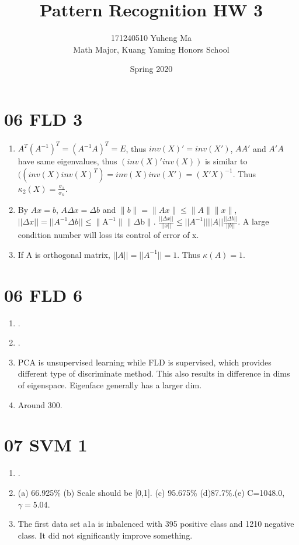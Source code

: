 \documentclass[10pt, oneside]{article}
\title{
Pattern Recognition HW 3
}
\author{171240510 Yuheng Ma\\[0.3cm]{Math Major, Kuang Yaming Honors School}}
\date{Spring 2020}
\begin{document}
\maketitle

\vspace{.25in}
\section{06 FLD 3}
\begin{enumerate}
	\item $A^{T}\left(A^{-1}\right)^{T}=\left(A^{-1} A\right)^{T}=E$, thus $inv(X)'=inv(X')$, $AA'$ and $A'A$ have same eigenvalues, thus $(inv(X)'inv(X))$ is similar to $((inv(X)inv(X)^T)=inv(X)inv(X')=(X'X)^{-1}$. Thus $\kappa_{2}(X)= \frac{\sigma_1}{\sigma_n}$.
	\item By $A x=b$, $ A\Delta x=\Delta b$ and $\|b\|=\|A x\| \leqslant\|A\|\|x\|$, $||\Delta x||=||A^{-1}\Delta b||\leqslant\| \mathrm{A}^{-1}\|\| \Delta \mathrm{b} \|$. $\frac{||\Delta x||}{||x||}\leqslant||A^{-1}||||A||\frac{||\Delta b||}{||b||}$. A large condition number will loss its control of error of x. 
	\item If A is orthogonal matrix, $||A||=||A^{-1}||=1$. Thus $\kappa(A)=1$. 
\end{enumerate}
\section{06 FLD 6}
\begin{enumerate}
	\item .
	\item .
	\item PCA is unsupervised learning while FLD is supervised, which provides different type of discriminate method. This also results in difference in dims of eigenspace. Eigenface generally has a larger dim.
	\item Around 300.
\end{enumerate}
\section{07 SVM 1}
\begin{enumerate}
	\item .
	\item (a) 66.925$\%$ (b) Scale should be [0,1]. (c) 95.675$\%$ (d)87.7$\%$.(e) C=1048.0,$\gamma=5.04$. 
	\item The first data set a1a is inbalenced with 395 positive class and 1210 negative class. It did not significantly improve something.
\end{enumerate}
\end{document}
